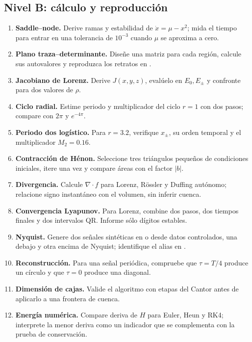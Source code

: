 \subsection*{Nivel B: cálculo y reproducción}
\begin{enumerate}
  \item[B1.] \textbf{Saddle--node.} Derive ramas y estabilidad de
  \(\dot x=\mu-x^2\); mida el tiempo para entrar en una tolerancia de \(10^{-3}\)
  cuando \(\mu\) se aproxima a cero.
  \item[B2.] \textbf{Plano traza--determinante.} Diseñe una matriz para cada región,
  calcule sus autovalores y reproduzca los retratos en .
  \item[B3.] \textbf{Jacobiano de Lorenz.} Derive \(J(x,y,z)\), evalúelo en
  \(E_0,E_\pm\) y confronte  para dos valores de \(\rho\).
  \item[B4.] \textbf{Ciclo radial.} Estime periodo y multiplicador del ciclo
  \(r=1\) con dos pasos; compare con \(2\pi\) y \(e^{-4\pi}\).
  \item[B5.] \textbf{Periodo dos logístico.} Para \(r=3.2\), verifique
  \(x_\pm\), su orden temporal y el multiplicador \(M_2=0.16\).
  \item[B6.] \textbf{Contracción de Hénon.} Seleccione tres triángulos pequeños de
  condiciones iniciales, itere una vez y compare áreas con el factor \(|b|\).
  \item[B7.] \textbf{Divergencia.} Calcule \(\nabla\cdot f\) para Lorenz, Rössler y
  Duffing autónomo; relacione signo instantáneo con el volumen, sin inferir cuenca.
  \item[B8.] \textbf{Convergencia Lyapunov.} Para Lorenz, combine dos pasos, dos
  tiempos finales y dos intervalos QR. Informe sólo dígitos estables.
  \item[B9.] \textbf{Nyquist.} Genere dos señales sintéticas en
   o desde datos controlados, una debajo y otra encima de Nyquist;
  identifique el alias en .
  \item[B10.] \textbf{Reconstrucción.} Para una señal periódica, compruebe que
  \(\tau=T/4\) produce un círculo y que \(\tau=0\) produce una diagonal.
  \item[B11.] \textbf{Dimensión de cajas.} Valide el algoritmo con etapas del Cantor
  antes de aplicarlo a una frontera de cuenca.
  \item[B12.] \textbf{Energía numérica.} Compare deriva de \(H\) para Euler, Heun y
  RK4; interprete la menor deriva como un indicador que se complementa con la prueba de conservación.
\end{enumerate}

